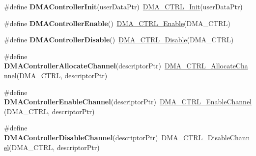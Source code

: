\begin{DoxyCompactItemize}
\item 
\hypertarget{group___func_ala_ga5d537b622559210e38f6d657504edfbe}{\#define {\bfseries D\-M\-A\-Controller\-Init}(user\-Data\-Ptr)~\hyperlink{group___d_m_a___c_t_r_l__module_ga553f7520948665feb02a5442ce5fb2cc}{D\-M\-A\-\_\-\-C\-T\-R\-L\-\_\-\-Init}(user\-Data\-Ptr)}\label{group___func_ala_ga5d537b622559210e38f6d657504edfbe}

\item 
\hypertarget{group___func_ala_ga9f68ccbeb664b2c91a4c8bc7e2a4bb97}{\#define {\bfseries D\-M\-A\-Controller\-Enable}()~\hyperlink{group___d_m_a___c_t_r_l__module_ga97900786e1447569fa5f6b5f132f37cf}{D\-M\-A\-\_\-\-C\-T\-R\-L\-\_\-\-Enable}(D\-M\-A\-\_\-\-C\-T\-R\-L)}\label{group___func_ala_ga9f68ccbeb664b2c91a4c8bc7e2a4bb97}

\item 
\hypertarget{group___func_ala_ga3c48218688f1c13cca4eb5a47feb1a8d}{\#define {\bfseries D\-M\-A\-Controller\-Disable}()~\hyperlink{group___d_m_a___c_t_r_l__module_gaf35ca3966d15fd0e3a4eefcbcfab2fdc}{D\-M\-A\-\_\-\-C\-T\-R\-L\-\_\-\-Disable}(D\-M\-A\-\_\-\-C\-T\-R\-L)}\label{group___func_ala_ga3c48218688f1c13cca4eb5a47feb1a8d}

\item 
\hypertarget{group___func_ala_gad0bcfca57be4ec6c1531cb2ceee3935e}{\#define {\bfseries D\-M\-A\-Controller\-Allocate\-Channel}(descriptor\-Ptr)~\hyperlink{group___d_m_a___c_t_r_l__module_gad38448a11f7f6afbe795f86fa4a19d76}{D\-M\-A\-\_\-\-C\-T\-R\-L\-\_\-\-Allocate\-Channel}(D\-M\-A\-\_\-\-C\-T\-R\-L, descriptor\-Ptr)}\label{group___func_ala_gad0bcfca57be4ec6c1531cb2ceee3935e}

\item 
\hypertarget{group___func_ala_gaac0aa99076486fbf1b4e5d914c3e3541}{\#define {\bfseries D\-M\-A\-Controller\-Enable\-Channel}(descriptor\-Ptr)~\hyperlink{group___d_m_a___c_t_r_l__module_gac803089bdb38d5f79260efb90dcd18d7}{D\-M\-A\-\_\-\-C\-T\-R\-L\-\_\-\-Enable\-Channel}(D\-M\-A\-\_\-\-C\-T\-R\-L, descriptor\-Ptr)}\label{group___func_ala_gaac0aa99076486fbf1b4e5d914c3e3541}

\item 
\hypertarget{group___func_ala_ga668e11bb97eebcbe06f5e2c12ee1e7a3}{\#define {\bfseries D\-M\-A\-Controller\-Disable\-Channel}(descriptor\-Ptr)~\hyperlink{group___d_m_a___c_t_r_l__module_ga80ab4c932d2e7d3c9a9af041fa8fa6de}{D\-M\-A\-\_\-\-C\-T\-R\-L\-\_\-\-Disable\-Channel}(D\-M\-A\-\_\-\-C\-T\-R\-L, descriptor\-Ptr)}\label{group___func_ala_ga668e11bb97eebcbe06f5e2c12ee1e7a3}


\end{DoxyCompactItemize}
